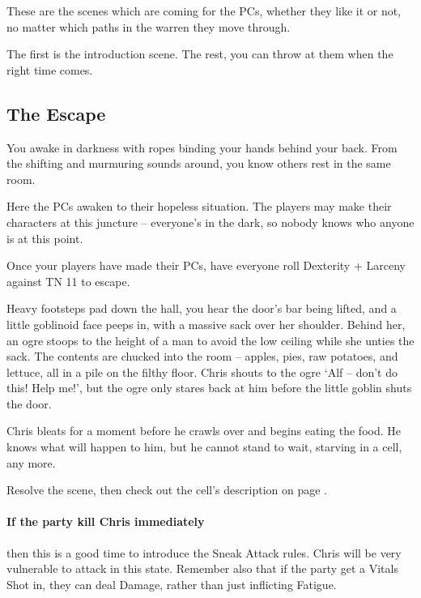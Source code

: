 
\begin{multicols}{2}

\noindent
These are the scenes which are coming for the PCs, whether they like it or not, no matter which paths in the warren they move through.

The first is the introduction scene.
The rest, you can throw at them when the right time comes.

\subsection{The Escape}
\label{escape}

\begin{boxtext}

	You awake in darkness with ropes binding your hands behind your back.
	From the shifting and murmuring sounds around, you know others rest in the same room.

\end{boxtext}

Here the PCs awaken to their hopeless situation.
The players may make their characters at this juncture -- everyone's in the dark, so nobody knows who anyone is at this point.

Once your players have made their PCs, have everyone roll Dexterity + Larceny against TN 11 to escape.

\begin{boxtext}

	Heavy footsteps pad down the hall, you hear the door's bar being lifted, and a little goblinoid face peeps in, with a massive sack over her shoulder.
	Behind her, an ogre stoops to the height of a man to avoid the low ceiling while she unties the sack.
	The contents are chucked into the room -- apples, pies, raw potatoes, and lettuce, all in a pile on the filthy floor.
	Chris shouts to the ogre `Alf -- don't do this! Help me!', but the ogre only stares back at him before the little goblin shuts the door.

\end{boxtext}

Chris bleats for a moment before he crawls over and begins eating the food.
He knows what will happen to him, but he cannot stand to wait, starving in a cell, any more.

Resolve the scene, then check out the cell's description on page \pageref{entrycell}.

\paragraph{If the party kill Chris immediately}
then this is a good time to introduce the Sneak Attack rules.
Chris will be very vulnerable to attack in this state.
Remember also that if the party get a Vitals Shot in, they can deal Damage, rather than just inflicting Fatigue.


\end{multicols}
